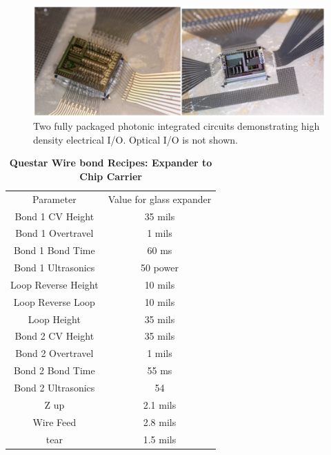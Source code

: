 \begin{figure}[!ht]
\centering
\includegraphics[width=5in]{./Figures/AppendixA/FigAppA16.png}
\caption{Two fully packaged photonic integrated circuits demonstrating high density electrical I/O. Optical I/O is not shown. }
\label{FigAppA16}
\end{figure}


\begin{table}[!ht]
\caption[Questar Wire bond Recipes: Expander to Chip Carrier]{\textbf{Questar Wire bond Recipes: Expander to Chip Carrier}}
\centering
\begin{tabular}{|c||c|}
\hline
Parameter & Value for glass expander \\ \hhline{|=|=|}
Bond 1 CV Height & 35 mils   \\ \hline
Bond 1 Overtravel & 1 mils   \\ \hline
Bond 1 Bond Time & 60 ms    \\ \hline
Bond 1 Ultrasonics & 50 power   \\ \hline
Loop Reverse Height & 10 mils  \\ \hline 
Loop Reverse Loop & 10 mils  \\ \hline
Loop Height & 35 mils \\ \hline
Bond 2 CV Height & 35 mils   \\ \hline
Bond 2 Overtravel & 1 mils   \\ \hline
Bond 2 Bond Time & 55 ms   \\ \hline
Bond 2 Ultrasonics & 54   \\ \hline
Z up & 2.1 mils \\ \hline
Wire Feed & 2.8 mils \\ \hline
tear & 1.5 mils  \\ \hline
\end{tabular}
\end{table}


